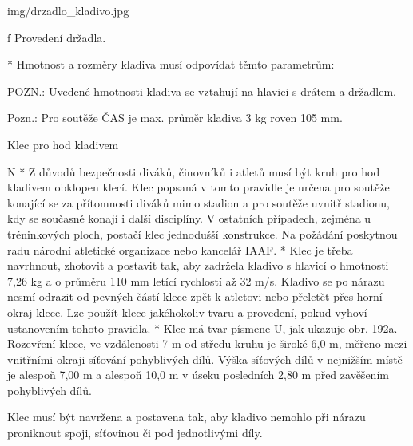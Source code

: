 \picw=5cm \inspic img/drzadlo_kladivo.jpg
\caption/f Provedení držadla.

* Hmotnost a rozměry kladiva musí odpovídat těmto parametrům:


POZN.: Uvedené hmotnosti kladiva se vztahují na hlavici s drátem a držadlem.

Pozn.: Pro soutěže ČAS je max. průměr kladiva 3 kg roven 105 mm.
\enditems

\secc Klec pro hod kladivem

\begitems \style N
* Z důvodů bezpečnosti diváků, činovníků i atletů musí být kruh pro hod kladivem obklopen klecí. Klec popsaná v tomto pravidle je určena pro soutěže konající se za přítomnosti diváků mimo stadion a pro soutěže uvnitř stadionu, kdy se současně konají i další disciplíny. V ostatních případech, zejména u tréninkových ploch, postačí klec jednodušší konstrukce. Na požádání poskytnou radu národní atletické organizace nebo kancelář IAAF.
* Klec je třeba navrhnout, zhotovit a postavit tak, aby zadržela kladivo s hlavicí o hmotnosti 7,26 kg a o průměru 110 mm letící rychlostí až 32 m/s. Kladivo se po nárazu nesmí odrazit od pevných částí klece zpět k atletovi nebo přeletět přes horní okraj klece. Lze použít klece jakéhokoliv tvaru a provedení, pokud vyhoví ustanovením tohoto pravidla.
* Klec má tvar písmene U, jak ukazuje obr. 192a. Rozevření klece, ve vzdálenosti 7 m od středu kruhu je široké 6,0 m, měřeno mezi vnitřními okraji síťování pohyblivých dílů. Výška síťových dílů v nejnižším místě je alespoň 7,00 m a alespoň 10,0 m v úseku posledních 2,80 m před zavěšením pohyblivých dílů.

Klec musí být navržena a postavena tak, aby kladivo nemohlo při nárazu proniknout spoji, síťovinou či pod jednotlivými díly.


